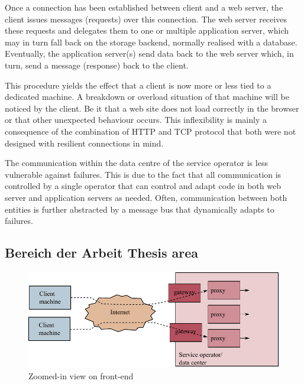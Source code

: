 \documentclass[10pt,a4paper,oneside]{scrartcl}
\begin{document}
	Once a connection has been established between client and a web server, the client issues
	messages (requests) over this connection. The web server receives these requests and
	delegates them to one or multiple application server, which may in turn fall back on the 
	storage backend, normally realised with a database. Eventually, the application server(s)
	send data back to the web server which, in turn, send a message (response) back to the
	client.

	This procedure yields the effect that a client is now more or less tied to a dedicated
	machine. A breakdown or overload situation of that machine will be noticed by the client. 
	Be it that a web site does not load correctly in the browser or that other unexpected 
	behaviour occurs. This inflexibility is mainly a consequence of the combination of HTTP and
	TCP protocol that both were not designed with resilient connections in mind.
	
	The communication within the data centre of the service operator is less vulnerable against
	failures. This is due to the fact that all communication is controlled by a single operator
	that can control and adapt code in both web server and application servers as needed.
	Often, communication between both entities is further abstracted by a message bus that
	dynamically adapts to failures.

\subsection{
	{Bereich der Arbeit}
	{Thesis area}}
\label{sub:topic}

\begin{figure}
 \begin{center}
	 \includegraphics[scale=.8]{./fig/front}
 \end{center}
 \caption{\label{fig:front}Zoomed-in view on front-end}
\end{figure}
\end{document}
